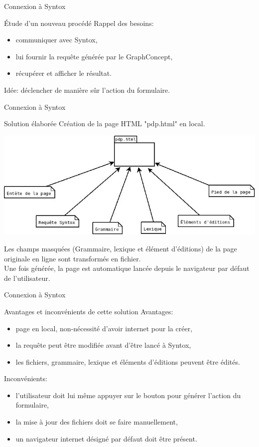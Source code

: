 \documentclass[8pt]{beamer}
\begin{document}
\begin{frame}{Connexion à Syntox}
\begin{block}{Étude d'un nouveau procédé}
Rappel des besoins:
\begin{itemize}
\item communiquer avec Syntox,
\item lui fournir la requête générée par le GraphConcept,
\item récupérer et afficher le résultat.
\end{itemize}
Idée: déclencher de manière sûr l'action du formulaire. 
\end{block}
\end{frame}

\begin{frame}{Connexion à Syntox}
\begin{block}{Solution élaborée}
Création de la page HTML "pdp.html" en local.
\begin{center}
\includegraphics[scale=0.35]{syntox_connection2.png}
\end{center}
Les champs masquées (Grammaire, lexique et élément d'éditions) de la page originale en ligne sont transformés en fichier.
\\ Une fois générée, la page est automatique lancée depuis le navigateur par défaut de l'utilisateur.
\end{block}
\end{frame}

\begin{frame}{Connexion à Syntox}
\begin{block}{Avantages et inconvénients de cette solution}
Avantages:
\begin{itemize}
\item page en local, non-nécessité d'avoir internet pour la créer,
\item la requête peut être modifiée avant d'être lancé à Syntox,
\item les fichiers, grammaire, lexique et éléments d'éditions peuvent être édités.
\end{itemize}
Inconvénients:
\begin{itemize}
\item l'utilisateur doit lui même appuyer sur le bouton pour générer l'action du formulaire,
\item la mise à jour des fichiers doit se faire manuellement,
\item un navigateur internet désigné par défaut doit être présent.
\end{itemize}
\end{block}
\end{frame}
\end{document}
